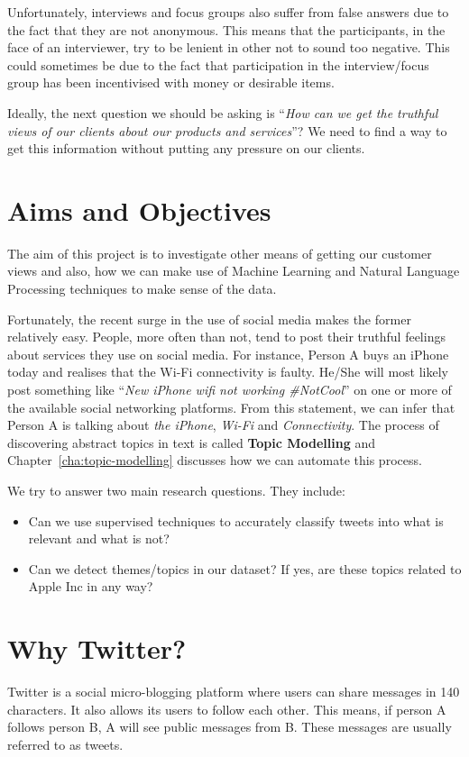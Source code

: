 Unfortunately, interviews and focus groups also suffer from false answers due to the fact that they
are not anonymous. This means that the participants, in the face of an interviewer, try to be
lenient in other not to sound too negative. This could sometimes be due to the fact that
participation in the interview/focus group has been incentivised with money or desirable items.

Ideally, the next question we should be asking is ``\textit{How can we get the truthful views of our
clients about our products and services}''? We need to find a way to get this information without
putting any pressure on our clients.

\section{Aims and Objectives}
\label{sec:objectives}
The aim of this project is to investigate other means of getting our customer views and also,
how we can make use of Machine Learning and Natural Language Processing techniques to make sense of
the data.

Fortunately, the recent surge in the use of social media makes the former relatively easy. People,
more often than not, tend to post their truthful feelings about services they use on social media.
For instance, Person A buys an iPhone today and realises that the Wi-Fi connectivity is faulty.
He/She will most likely post something like ``\textit{New iPhone wifi not working \#NotCool}'' on
one or more of the available social networking platforms. From this statement, we can infer that
Person A is talking about \textit{the iPhone}, \textit{Wi-Fi} and \textit{Connectivity}. The process
of discovering abstract topics in text is called \textbf{Topic Modelling} and
Chapter~\ref{cha:topic-modelling} discusses how we can automate this process.

We try to answer two main research questions. They include:
\begin{itemize}
  \item Can we use supervised techniques to accurately classify tweets into what is relevant and
    what is not?
  \item Can we detect themes/topics in our dataset? If yes, are these topics related to Apple Inc in
    any way?
\end{itemize}


\section{Why Twitter?}
\label{sec:why-twitter}
Twitter is a social micro-blogging platform where users can share messages in 140 characters. It
also allows its users to follow each other. This means, if person A follows person B, A will see
public messages from B. These messages are usually referred to as tweets.

